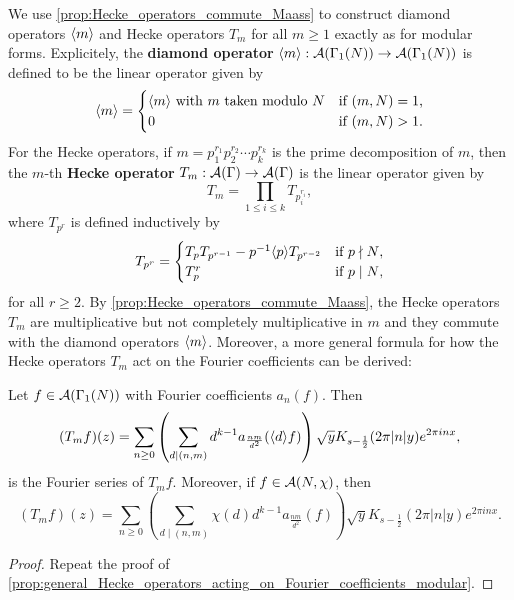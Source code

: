       We use \cref{prop:Hecke_operators_commute_Maass} to construct diamond operators $\langle m\rangle$ and Hecke operators $T_{m}$ for all $m \ge 1$ exactly as for modular forms. Explicitely, the \textbf{diamond operator} $\langle m\rangle:\mathcal{A}(\Gamma_{1}(N)) \to \mathcal{A}(\Gamma_{1}(N))$ is defined to be the linear operator given by
      \[
        \langle m\rangle = \begin{cases} \langle m\rangle \text{ with $m$ taken modulo $N$} & \text{if $(m,N) = 1$,} \\ 0 & \text{if $(m,N) > 1$.} \end{cases}
      \]
      For the Hecke operators, if $m = p_{1}^{r_{1}}p_{2}^{r_{2}} \cdots p_{k}^{r_{k}}$ is the prime decomposition of $m$, then the $m$-th \textbf{Hecke operator} $T_{m}:\mathcal{A}(\Gamma) \to \mathcal{A}(\Gamma)$ is the linear operator given by
      \[
        T_{m} = \prod_{1 \le i \le k}T_{p_{i}^{r_{i}}},
      \]
      where $T_{p^{r}}$ is defined inductively by
      \[
        T_{p^{r}} = \begin{cases} T_{p}T_{p^{r-1}}-p^{-1}\langle p\rangle T_{p^{r-2}} & \text{if $p \nmid N$}, \\ T_{p}^{r} & \text{if $p \mid N$}, \end{cases}
      \]
      for all $r \ge 2$. By \cref{prop:Hecke_operators_commute_Maass}, the Hecke operators $T_{m}$ are multiplicative but not completely multiplicative in $m$ and they commute with the diamond operators $\langle m\rangle$. Moreover, a more general formula for how the Hecke operators $T_{m}$ act on the Fourier coefficients can be derived:

      \begin{proposition}\label{prop:general_Hecke_operators_acting_on_Fourier_coefficients_Maass}
        Let $f \in \mathcal{A}(\Gamma_{1}(N))$ with Fourier coefficients $a_{n}(f)$. Then
        \[
          (T_{m}f)(z) = \sum_{n \ge 0}\left(\sum_{d \mid (n,m)}d^{k-1}a_{\frac{nm}{d^{2}}}(\langle d\rangle f)\right)\sqrt{y}K_{s-\frac{1}{2}}(2\pi|n|y)e^{2\pi inx},
        \]
        is the Fourier series of $T_{m}f$. Moreover, if $f \in \mathcal{A}(N,\chi)$, then
        \[
          (T_{m}f)(z) = \sum_{n \ge 0}\left(\sum_{d \mid (n,m)}\chi(d)d^{k-1}a_{\frac{nm}{d^{2}}}(f)\right)\sqrt{y}K_{s-\frac{1}{2}}(2\pi|n|y)e^{2\pi inx}.
        \]
      \end{proposition}
      \begin{proof}
        Repeat the proof of \cref{prop:general_Hecke_operators_acting_on_Fourier_coefficients_modular}.
      \end{proof}

